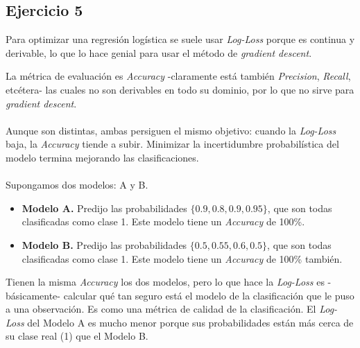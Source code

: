 \documentclass[a4paper,12pt]{article}
\begin{document}
        \subsection*{Ejercicio 5}
            \noindent Para optimizar una regresión logística se suele usar \textit{Log-Loss} porque es continua y derivable, lo que lo hace genial para usar el método de \textit{gradient descent}.

            \noindent La métrica de evaluación es \textit{Accuracy} -claramente está también \textit{Precision}, \textit{Recall}, etcétera- las cuales no son derivables en todo su dominio, por lo que no sirve para \textit{gradient descent}. \\
            \\
            \noindent Aunque son distintas, ambas persiguen el mismo objetivo: cuando la \textit{Log-Loss} baja, la \textit{Accuracy} tiende a subir. Minimizar la incertidumbre probabilística del modelo termina mejorando las clasificaciones. \\
            \\
            \noindent Supongamos dos modelos: A y B.
            \begin{itemize}
                \item \textbf{Modelo A.} Predijo las probabilidades \(\{0.9, 0.8, 0.9, 0.95\}\), que son todas clasificadas como clase 1. Este modelo tiene un \textit{Accuracy} de 100\%.
                \item \textbf{Modelo B.} Predijo las probabilidades \(\{0.5, 0.55, 0.6, 0.5\}\), que son todas clasificadas como clase 1. Este modelo tiene un \textit{Accuracy} de 100\% también.
            \end{itemize}
            Tienen la misma \textit{Accuracy} los dos modelos, pero lo que hace la \textit{Log-Loss} es -básicamente- calcular qué tan seguro está el modelo de la clasificación que le puso a una observación. Es como una métrica de calidad de la clasificación. El \textit{Log-Loss} del Modelo A es mucho menor porque sus probabilidades están más cerca de su clase real (1) que el Modelo B.
\end{document}
